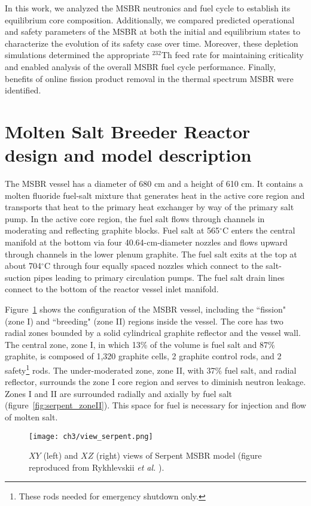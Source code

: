 In this work, we analyzed the \gls{MSBR} neutronics and fuel cycle
to 
establish its equilibrium core composition. Additionally, we
compared 
predicted operational and safety parameters of the
\gls{MSBR} at both the 
initial and equilibrium states to characterize
the evolution of its safety 
case over time. Moreover, these depletion simulations
determined the 
appropriate $^{232}$Th feed rate for maintaining criticality and enabled 
analysis of the overall \gls{MSBR} fuel cycle
performance. Finally, benefits 
of online fission product removal in the thermal spectrum \gls{MSBR} were 
identified.


\section{Molten Salt Breeder Reactor design and model description}
The \gls{MSBR} vessel has a diameter of 680 cm and a height of 610 cm. It 
contains a molten fluoride fuel-salt mixture that generates heat in the active 
core region and transports that heat to the primary heat exchanger by way of 
the primary salt pump. In the active core region, the fuel salt flows through 
channels in moderating and reflecting graphite blocks. Fuel salt at 
565$^{\circ}$C enters the central manifold at the bottom via four  
40.64-cm-diameter nozzles and flows upward through channels in the lower 
plenum graphite. The fuel salt exits at the top at about 704$^{\circ}$C 
through four equally spaced nozzles which connect to the salt-suction pipes 
leading to primary circulation pumps. The fuel salt drain lines connect to the 
bottom of the reactor vessel inlet manifold.

Figure~\ref{fig:serpent_plan_view} shows the configuration of the \gls{MSBR} 
vessel, including the ``fission" (zone I) and ``breeding" (zone II) regions 
inside the vessel. The core has two radial zones bounded by a solid  
cylindrical graphite reflector and the vessel wall. The central zone, zone I, 
in which 13\% of the volume is fuel salt and 87\% graphite, is composed of 
1,320 graphite cells, 2 graphite control rods, and 2 safety\footnote{ These 
rods needed for emergency shutdown only.} rods. The under-moderated zone, zone 
II, with 37\% fuel salt, and radial reflector, surrounds the zone I core 
region and serves to diminish neutron leakage. Zones I and II are surrounded 
radially and axially by fuel salt (figure~\ref{fig:serpent_zoneII}). This 
space for fuel is necessary for injection and flow of molten salt.
\begin{figure}[t] %
	\texttt{[image: ch3/view\_serpent.png]}
	\caption{$XY$ (left) and $XZ$ (right) views of Serpent \gls{MSBR} model 
	(figure reproduced from Rykhlevskii \emph{et al.} 
	\cite{rykhlevskii_modeling_2019}).}
	\label{fig:serpent_plan_view}
\end{figure}

